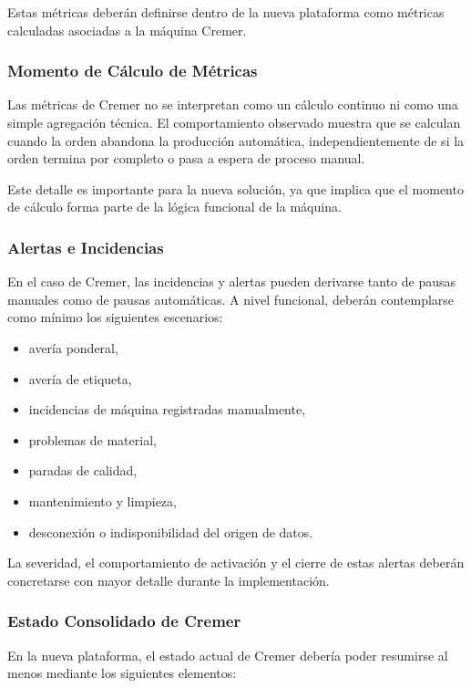 Estas métricas deberán definirse dentro de la nueva plataforma como métricas calculadas asociadas a la máquina Cremer.

\subsubsection{Momento de Cálculo de Métricas}

Las métricas de Cremer no se interpretan como un cálculo continuo ni como una simple agregación técnica. El comportamiento observado muestra que se calculan cuando la orden abandona la producción automática, independientemente de si la orden termina por completo o pasa a espera de proceso manual.

Este detalle es importante para la nueva solución, ya que implica que el momento de cálculo forma parte de la lógica funcional de la máquina.

\subsubsection{Alertas e Incidencias}

En el caso de Cremer, las incidencias y alertas pueden derivarse tanto de pausas manuales como de pausas automáticas. A nivel funcional, deberán contemplarse como mínimo los siguientes escenarios:

\begin{itemize}
    \item avería ponderal,
    \item avería de etiqueta,
    \item incidencias de máquina registradas manualmente,
    \item problemas de material,
    \item paradas de calidad,
    \item mantenimiento y limpieza,
    \item desconexión o indisponibilidad del origen de datos.
\end{itemize}

La severidad, el comportamiento de activación y el cierre de estas alertas deberán concretarse con mayor detalle durante la implementación.

\subsubsection{Estado Consolidado de Cremer}

En la nueva plataforma, el estado actual de Cremer debería poder resumirse al menos mediante los siguientes elementos:

